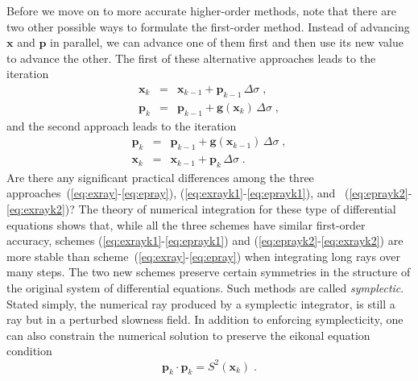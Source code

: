 \documentclass[12pt]{handout}
\begin{document}
Before we move on to more accurate higher-order methods, note that there are
two other possible ways to formulate the first-order method. Instead of
advancing $\mathbf{x}$ and $\mathbf{p}$ in parallel, we can advance one of
them first and then use its new value to advance the other. The first of these
alternative approaches leads to the iteration
\begin{eqnarray}
  \label{eq:exrayk1}
  \mathbf{x}_k & = & \mathbf{x}_{k-1} + \mathbf{p}_{k-1}\,\Delta \sigma\;, \\
  \label{eq:eprayk1}
  \mathbf{p}_k & = & \mathbf{p}_{k-1} + \mathbf{g}(\mathbf{x}_{k})\,
  \Delta \sigma\;,
\end{eqnarray}
and the second approach leads to the iteration
\begin{eqnarray}
  \label{eq:eprayk2}
  \mathbf{p}_k & = & \mathbf{p}_{k-1} + \mathbf{g}(\mathbf{x}_{k-1})\,
  \Delta \sigma\;, 
  \\
  \label{eq:exrayk2}
  \mathbf{x}_k & = & \mathbf{x}_{k-1} + \mathbf{p}_{k}\,\Delta \sigma\;.
\end{eqnarray}
Are there any significant practical differences among the three
approaches~(\ref{eq:exray}-\ref{eq:epray}),
(\ref{eq:exrayk1}-\ref{eq:eprayk1}), and
~(\ref{eq:eprayk2}-\ref{eq:exrayk2})? The theory of numerical
integration for these type of differential equations shows that, while
all the three schemes have similar first-order accuracy, schemes
(\ref{eq:exrayk1}-\ref{eq:eprayk1}) and
(\ref{eq:eprayk2}-\ref{eq:exrayk2}) are more stable than
scheme~(\ref{eq:exray}-\ref{eq:epray}) when integrating long rays over
many steps. The two new schemes preserve certain symmetries in the
structure of the original system of differential equations. Such
methods are called \emph{symplectic}. Stated simply, the numerical ray
produced by a symplectic integrator, is still a ray but in a perturbed
slowness field.
In addition to enforcing symplecticity, one can also constrain the
numerical solution to preserve the eikonal equation condition
\begin{equation}
  \label{eq:eikonal}
  \mathbf{p}_k \cdot \mathbf{p}_k = S^2(\mathbf{x}_k)\;.
\end{equation}
\end{document}
